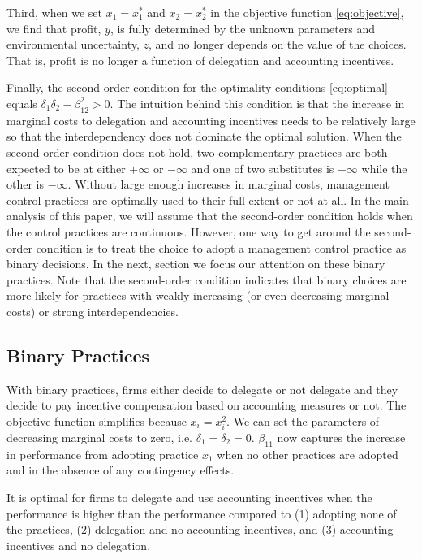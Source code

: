 \documentclass[12pt]{article}
\begin{document}
Third, when we set $x_1 = x_1^*$ and  $x_2 = x_2^*$ in the objective function  \eqref{eq:objective}, we find that profit, $y$, is fully determined by the unknown parameters and environmental uncertainty, $z$, and no longer depends on the value of the choices. That is, profit is no longer a function of delegation and accounting incentives. 

Finally, the second order condition for the optimality conditions \eqref{eq:optimal} equals  $\delta_1 \delta_2 - \beta_{12}^2 > 0$. The intuition behind this condition is that the increase in marginal costs to delegation and accounting incentives needs to be relatively large so that the interdependency does not dominate the optimal solution. When the second-order condition does not hold, two complementary practices are both expected to be at either \(+\infty\) or \(-\infty\) and one of two substitutes is \(+\infty\) while the other is \(-\infty\). Without large enough increases in marginal costs, management control practices are optimally used to their full extent or not at all. In the main analysis of this paper, we will assume that the second-order condition holds when the control practices are continuous. However, one way to get around the second-order condition is to treat the choice to adopt a management control practice as binary decisions. In the next, section we focus our attention on these binary practices. Note that the second-order condition indicates that binary choices are more likely for practices with weakly increasing (or even decreasing marginal costs) or strong interdependencies.

\subsection{Binary Practices}

With binary practices, firms either decide to delegate or not delegate and they decide to pay incentive compensation based on accounting measures or not. The objective function simplifies because $x_i = x_i^2$. We can set the parameters of decreasing marginal costs to zero, i.e. $\delta_1 = \delta_2  = 0$. $\beta_{11}$ now captures the increase in performance from adopting practice $x_1$ when no other practices are adopted and in the absence of any contingency effects. 

It is optimal for firms to delegate and use accounting incentives when the performance is higher than the performance compared to (1) adopting none of the practices, (2) delegation and no accounting incentives, and (3) accounting incentives and no delegation. 
\end{document}
